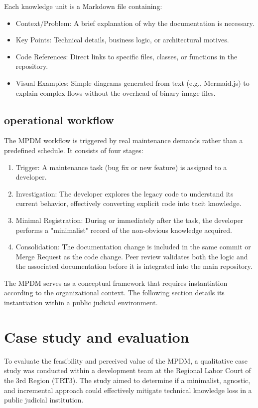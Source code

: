 \documentclass{ieeeaccess}
\begin{document}
Each knowledge unit is a Markdown file containing:

\begin{itemize}
\item Context/Problem: A brief explanation of why the documentation is necessary.
\item Key Points: Technical details, business logic, or architectural motives.
\item Code References: Direct links to specific files, classes, or functions in the repository.
\item Visual Examples: Simple diagrams generated from text (e.g., Mermaid.js) to explain complex flows without the overhead of binary image files.
\end{itemize}

\subsection{operational workflow}

The MPDM workflow is triggered by real maintenance demands rather than a predefined schedule. It consists of four stages:

\begin{enumerate}
    \item Trigger: A maintenance task (bug fix or new feature) is assigned to a developer.
    \item Investigation: The developer explores the legacy code to understand its current behavior, effectively converting explicit code into tacit knowledge.
    \item Minimal Registration: During or immediately after the task, the developer performs a "minimalist" record of the non-obvious knowledge acquired.
    \item Consolidation: The documentation change is included in the same commit or Merge Request as the code change. Peer review validates both the logic and the associated documentation before it is integrated into the main repository.
\end{enumerate}

The MPDM serves as a conceptual framework that requires instantiation according to the organizational context. The following section details its instantiation within a public judicial environment.

\section{Case study and evaluation}
To evaluate the feasibility and perceived value of the MPDM, a qualitative case study was conducted within a development team at the Regional Labor Court of the 3rd Region (TRT3). The study aimed to determine if a minimalist, agnostic, and incremental approach could effectively mitigate technical knowledge loss in a public judicial institution.
\end{document}

